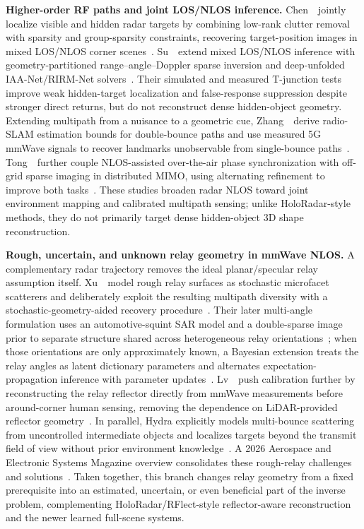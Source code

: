 \vspace{0.8mm}
\noindent \textbf{Higher-order RF paths and joint LOS/NLOS inference.}
Chen~\etal~jointly localize visible and hidden radar targets by combining low-rank clutter removal with sparsity and group-sparsity constraints, recovering target-position images in mixed LOS/NLOS corner scenes~\cite{chenJointLOSNLOSClutter2025}. Su~\etal~extend mixed LOS/NLOS inference with geometry-partitioned range--angle--Doppler sparse inversion and deep-unfolded IAA-Net/RIRM-Net solvers~\cite{suJointLOSNLOSDeepUnfolding2026}. Their simulated and measured T-junction tests improve weak hidden-target localization and false-response suppression despite stronger direct returns, but do not reconstruct dense hidden-object geometry. Extending multipath from a nuisance to a geometric cue, Zhang~\etal~derive radio-SLAM estimation bounds for double-bounce paths and use measured 5G mmWave signals to recover landmarks unobservable from single-bounce paths~\cite{zhangDoubleBounceRadioSLAM2026}. Tong~\etal~further couple NLOS-assisted over-the-air phase synchronization with off-grid sparse imaging in distributed MIMO, using alternating refinement to improve both tasks~\cite{tongNLOSAidedMIMO2026}. These studies broaden radar NLOS toward joint environment mapping and calibrated multipath sensing; unlike HoloRadar-style methods, they do not primarily target dense hidden-object 3D shape reconstruction.

\vspace{0.8mm}
\noindent \textbf{Rough, uncertain, and unknown relay geometry in mmWave NLOS.}
A complementary radar trajectory removes the ideal planar/specular relay assumption itself. Xu~\etal~model rough relay surfaces as stochastic microfacet scatterers and deliberately exploit the resulting multipath diversity with a stochastic-geometry-aided recovery procedure~\cite{xuRoughRelayMmWave2024}. Their later multi-angle formulation uses an automotive-squint SAR model and a double-sparse image prior to separate structure shared across heterogeneous relay orientations~\cite{xuDoubleSparseMmWave2024}; when those orientations are only approximately known, a Bayesian extension treats the relay angles as latent dictionary parameters and alternates expectation-propagation inference with parameter updates~\cite{xuBayesianMmWave2025}. Lv~\etal~push calibration further by reconstructing the relay reflector directly from mmWave measurements before around-corner human sensing, removing the dependence on LiDAR-provided reflector geometry~\cite{lvRelayReflector2025}. In parallel, Hydra explicitly models multi-bounce scattering from uncontrolled intermediate objects and localizes targets beyond the transmit field of view without prior environment knowledge~\cite{mehrotraHydra2024}. A 2026 Aerospace and Electronic Systems Magazine overview consolidates these rough-relay challenges and solutions~\cite{liuRoughRelaySurvey2026}. Taken together, this branch changes relay geometry from a fixed prerequisite into an estimated, uncertain, or even beneficial part of the inverse problem, complementing HoloRadar/RFlect-style reflector-aware reconstruction and the newer learned full-scene systems.


